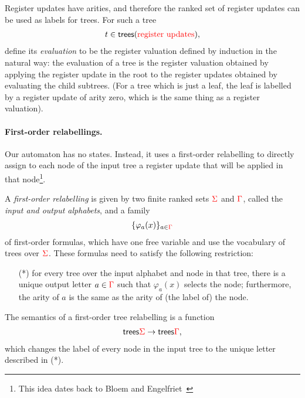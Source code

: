 Register updates have arities, and therefore the ranked set of register updates can be used as labels for trees. For such a  tree 
\begin{align*}
    t \in  \mathsf {trees}({\color{red}{\text{register updates}}}),
\end{align*}
define its \emph{evaluation} to be the register valuation defined by induction in the natural way: the evaluation of a tree is the register valuation obtained by applying the register update in the root to the register updates obtained by evaluating the child subtrees. (For a tree which is just a leaf, the leaf is labelled by a register update of arity zero, which is the same thing as a register valuation). 


\paragraph*{First-order relabellings.} Our automaton has no states. Instead, it uses a first-order relabelling to  directly assign to each node of the input tree a register update that will be applied in that node\footnote{This idea dates back to   Bloem and Engelfriet~\cite[Theorem 17]{bloem_comparison_2000}}.


\begin{definition} \label{def:forat}  A \emph{first-order relabelling} is given by two finite ranked sets ${\color{red}{\Sigma}}$ and ${\color{red}{\Gamma}}$, called the \emph{input and output alphabets}, and a family 
    \begin{align*}
    \{\varphi_a(x)\}_{a \in {\color{red}{\Gamma}}}
    \end{align*}
    of first-order formulas, which have one free variable and use the vocabulary of trees over  ${\color{red}{\Sigma}}$. These formulas need to satisfy the following restriction:
    \begin{enumerate}
        \item[(*)] for every tree over the input alphabet and node in that tree, there is a unique output letter $a \in {\color{red}{\Gamma}}$ such that $\varphi_a(x)$ selects the node; furthermore, the arity of $a$ is the same as the arity of (the label of) the node. 
    \end{enumerate}
The semantics of a  first-order tree relabelling is a function 
\begin{align*}
\mathsf {trees} {\color{red}{\Sigma}} \to \mathsf {trees} {\color{red}{\Gamma}},
\end{align*}
which changes the label of every node in the input tree to the unique letter described in  (*). 
      \end{definition}


